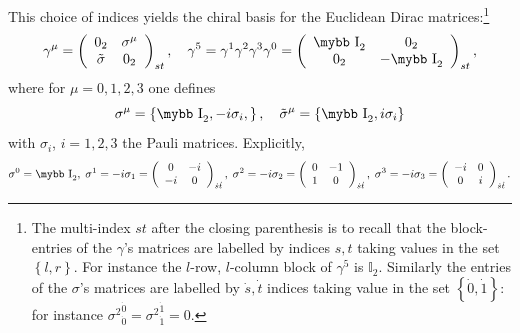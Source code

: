 \documentclass[11pt]{article}
\def\bb#1{\hbox{\mybb#1}}
\begin{document}
This choice of indices yields the chiral basis for the Euclidean
Dirac matrices:{\footnote{The multi-index $st$ after the closing parenthesis is
      to recall that the block-entries of the $\gamma$'s matrices
      are labelled by indices $s,t$ taking values in the set
      $\left\{l,r\right\}$. For instance the $l$-row, $l$-column block
      of $\gamma^5$ is $\mathbb I_2$. Similarly the entries of the
      $\sigma$'s matrices are labelled by $\dot s, \dot t$ indices
      taking value in the set $\left\{\dot 0, \dot 1\right\}$: for
      instance ${\sigma^2}^{\dot 0}_{\dot 0} ={\sigma^2}^{\dot 1}_{\dot 1} = 0$. }}
\begin{equation}
  \label{eq:3}
\gamma^\mu=\left(\begin{array}{cc}  0_2
  & {\sigma^\mu} \\{\tilde\sigma}&  0_2
\end{array}\right)_{st},\quad
\gamma^5=\gamma^1\gamma^2\gamma^3\gamma^0 =\left(\begin{array}{cc}  \bb I_2
  & 0_2\\ 0_2& - \bb I_2
\end{array}\right)_{st},
\end{equation}
where for $\mu = 0,1,2,3$ one defines
\begin{equation}
  \label{eq:1}
  \sigma^\mu =\left\{\bb I _2, -i\sigma_i, \right\},\quad
  \tilde\sigma^\mu =\left\{\bb I_2, i\sigma_i\right\}
\end{equation}
with $\sigma_{i}$, $i=1,2,3$ the Pauli matrices. Explicitly,
\begin{equation}
\nonumber
 \label{eq:43}
\sigma^0 =\bb I_2,\; \sigma^1 = - i \sigma_1 =  \left(\begin{array}{cc} 0 & -i \\ - i & 0
\end{array}\right)_{\dot s \dot t},\;
\sigma^2 = - i \sigma_2 =  \left(\begin{array}{cc} 0 & -1 \\ 1 & 0
\end{array}\right) _{\dot s \dot t},\;
\sigma^3 = - i \sigma_3 =  \left(\begin{array}{cc} -i & 0 \\ 0 & i
\end{array}\right) _{\dot s \dot t}.
\end{equation}
\end{document}
